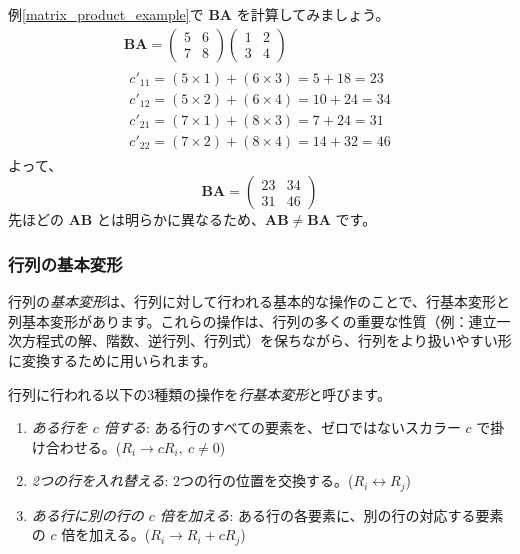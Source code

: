 \begin{ex}[交換法則が成り立たない例]
例\ref{matrix_product_example}で $\bm{B}\bm{A}$ を計算してみましょう。
\begin{gather*}
\bm{B}\bm{A} = \begin{pmatrix} 5 & 6 \\ 7 & 8 \end{pmatrix} \begin{pmatrix} 1 & 2 \\ 3 & 4 \end{pmatrix}\\
\begin{aligned}
c'_{11} = (5 \times 1) + (6 \times 3) = 5 + 18 = 23\\
c'_{12} = (5 \times 2) + (6 \times 4) = 10 + 24 = 34\\
c'_{21} = (7 \times 1) + (8 \times 3) = 7 + 24 = 31\\
c'_{22} = (7 \times 2) + (8 \times 4) = 14 + 32 = 46
\end{aligned}
\end{gather*}
よって、
\[\bm{B}\bm{A} = \begin{pmatrix} 23 & 34 \\ 31 & 46 \end{pmatrix}\]
先ほどの $\bm{A}\bm{B}$ とは明らかに異なるため、$\bm{A}\bm{B} \neq \bm{B}\bm{A}$ です。
\end{ex}

\subsubsection{行列の基本変形}

行列の\emph{基本変形}は、行列に対して行われる基本的な操作のことで、行基本変形と列基本変形があります。これらの操作は、行列の多くの重要な性質（例：連立一次方程式の解、階数、逆行列、行列式）を保ちながら、行列をより扱いやすい形に変換するために用いられます。

\begin{dfn}[行基本変形]
行列に行われる以下の3種類の操作を\emph{行基本変形}と呼びます。
\begin{enumerate}
    \item \emph{ある行を $c$ 倍する}: ある行のすべての要素を、ゼロではないスカラー $c$ で掛け合わせる。($R_i \to cR_i,\ c \neq 0$)
    \item \emph{2つの行を入れ替える}: 2つの行の位置を交換する。($R_i \leftrightarrow R_j$)
    \item \emph{ある行に別の行の $c$ 倍を加える}: ある行の各要素に、別の行の対応する要素の $c$ 倍を加える。($R_i \to R_i + cR_j$)
\end{enumerate}
\end{dfn}

